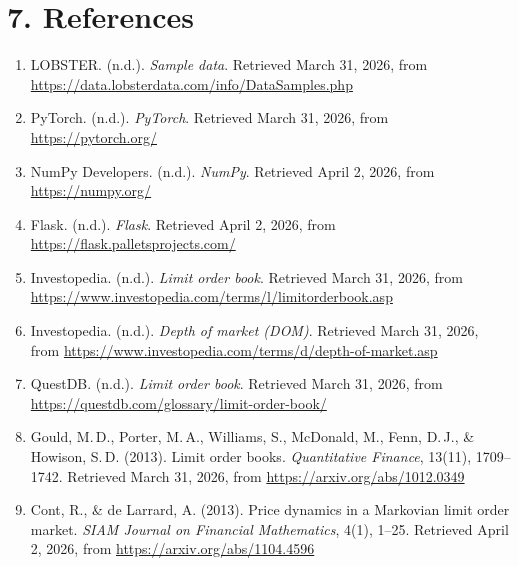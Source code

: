 \documentclass[11pt]{article}
\begin{document}
\section*{7. References}
\begin{enumerate}
    \item LOBSTER. (n.d.). \textit{Sample data}. Retrieved March 31, 2026, from
    \url{https://data.lobsterdata.com/info/DataSamples.php}
    \item PyTorch. (n.d.). \textit{PyTorch}. Retrieved March 31, 2026, from
    \url{https://pytorch.org/}
    \item NumPy Developers. (n.d.). \textit{NumPy}. Retrieved April 2, 2026,
    from \url{https://numpy.org/}
    \item Flask. (n.d.). \textit{Flask}. Retrieved April 2, 2026, from
    \url{https://flask.palletsprojects.com/}
    \item Investopedia. (n.d.). \textit{Limit order book}. Retrieved March 31,
    2026, from
    \url{https://www.investopedia.com/terms/l/limitorderbook.asp}
    \item Investopedia. (n.d.). \textit{Depth of market (DOM)}. Retrieved March
    31, 2026, from
    \url{https://www.investopedia.com/terms/d/depth-of-market.asp}
    \item QuestDB. (n.d.). \textit{Limit order book}. Retrieved March 31, 2026,
    from \url{https://questdb.com/glossary/limit-order-book/}
    \item Gould, M.\,D., Porter, M.\,A., Williams, S., McDonald, M., Fenn,
    D.\,J., \& Howison, S.\,D. (2013). Limit order books.
    \textit{Quantitative Finance}, 13(11), 1709--1742.
    Retrieved March 31, 2026, from \url{https://arxiv.org/abs/1012.0349}
    \item Cont, R., \& de Larrard, A. (2013). Price dynamics in a Markovian
    limit order market. \textit{SIAM Journal on Financial Mathematics}, 4(1),
    1--25. Retrieved April 2, 2026, from
    \url{https://arxiv.org/abs/1104.4596}
\end{enumerate}
\end{document}
